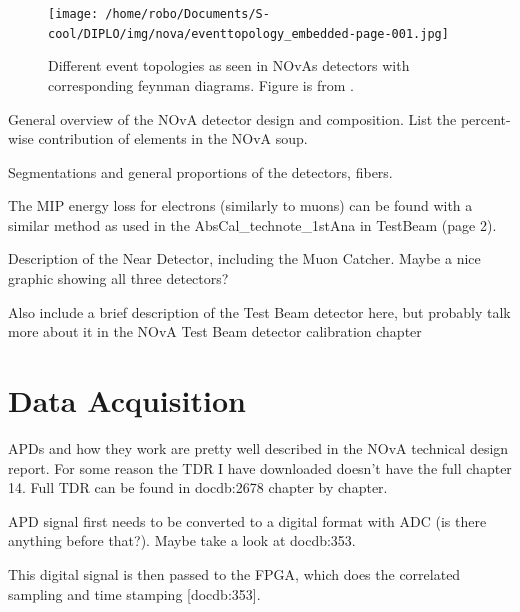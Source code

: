 \begin{figure}[ht]
\centering
\texttt{[image: /home/robo/Documents/S-cool/DIPLO/img/nova/eventtopology\_embedded-page-001.jpg]}
\caption[NOvA detectors event topologies]{Different event topologies as seen in NOvAs detectors with corresponding feynman diagrams. Figure is from \cite{NOvAInteractionsPlot.pdf}.}
\label{interactions}
\end{figure}
\fi

General overview of the NOvA detector design and composition. List the percent-wise contribution of elements in the NOvA soup.

Segmentations and general proportions of the detectors, fibers.

The MIP energy loss for electrons (similarly to muons) can be found with a similar method as used in the AbsCal\_technote\_1stAna in TestBeam (page 2).

Description of the Near Detector, including the Muon Catcher. Maybe a nice graphic showing all three detectors?

Also include a brief description of the Test Beam detector here, but probably talk more about it in the NOvA Test Beam detector calibration chapter

\section{Data Acquisition}

APDs and how they work are pretty well described in the NOvA technical design report. For some reason the TDR I have downloaded doesn't have the full chapter 14. Full TDR can be found in docdb:2678 chapter by chapter.

APD signal first needs to be converted to a digital format with ADC (is there anything before that?). Maybe take a look at docdb:353.

This digital signal is then passed to the FPGA, which does the correlated sampling and time stamping [docdb:353].

